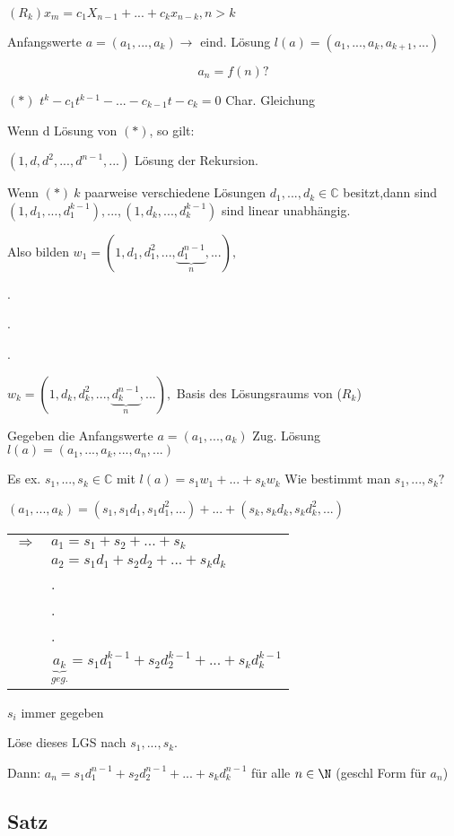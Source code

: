 $(R_k) x_m = c_1X_{n-1}+...+c_kx_{n-k}, n>k$

Anfangswerte $a=(a_1,...,a_k) \rightarrow $ eind. Lösung $l(a)=(a_1,...,a_k,a_{k+1},...)$

$$ a_n = f(n)?$$

$(*)$  $t^k-c_1t^{k-1}-...-c_{k-1}t-c_k=0 $ Char. Gleichung

Wenn d Lösung von $(*)$, so gilt:

$(1,d,d^2,...,d^{n-1},...)$ Lösung der Rekursion.

Wenn $(*)~k$ paarweise verschiedene Lösungen $d_1,...,d_k \in \mathbb{C}$ besitzt,dann  sind $(1,d_1,...,d_1^{k-1}) ,...,(1,d_k,...,d_k^{k-1})$ sind linear unabhängig.

Also bilden $w_1=(1,d_1,d_1^2,...,\underbrace{d_1^{n-1}}_n,...),$

\qquad\qquad\qquad\qquad\qquad\qquad.

\qquad\qquad\qquad\qquad\qquad\qquad.

\qquad\qquad\qquad\qquad\qquad\qquad.

\qquad\qquad\quad$w_k=(1,d_k,d_k^2,...,\underbrace{d_k^{n-1}}_n,...),$ \qquad Basis des Lösungsraums von ($R_k$)

Gegeben die Anfangswerte $a=(a_1,...,a_k)$ Zug. Lösung $l(a) = (a_1,...,a_k,...,a_n,...)$

Es ex. $s_1,...,s_k \in \mathbb{C}$ mit $ l(a)= s_1w_1+...+s_kw_k$ \qquad Wie bestimmt man $s_1,...,s_k?$

$(a_1,...,a_k)=(s_1,s_1d_1,s_1d_1^2,...)+...+(s_k,s_kd_k,s_kd_k^2,...)$

\begin{tabular}{l l}
	$\Rightarrow$ & $a_1 = s_1+s_2+...+s_k$\\
	& $a_2 = s_1d_1+s_2d_2+...+s_kd_k$\\
	&.\\
	&.\\
	&.\\
	&$\underbrace{a_k}_{geg.} = s_1d_1^{k-1}+s_2d_2^{k-1}+...+s_kd_k^{k-1}$ 	
\end{tabular}\qquad $s_i$ immer gegeben

Löse dieses LGS nach $ s_1,...,s_k.$

Dann: $a_n = s_1d_1^{n-1}+s_2d_2^{n-1}+...+s_kd_k^{n-1}$ für alle $n \in \N$ (geschl Form für $a_n$) 

\subsection{Satz} %


